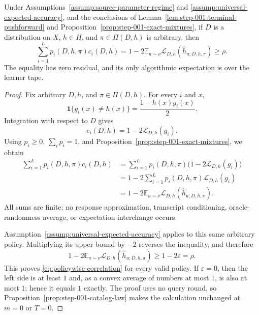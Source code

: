 \begin{lemma}
\label{lem:step-002-policywise-correlation}
Under Assumptions~\ref{assump:source-parameter-regime} and
\ref{assump:universal-expected-accuracy}, and the conclusions of
Lemma~\ref{lem:step-001-terminal-pushforward} and
Proposition~\ref{prop:step-001-exact-mixtures}, if $D$ is a distribution on
$X$, $h\in H$, and $\pi\in\Pi(D,h)$ is arbitrary, then
\begin{equation}\label{eq:policywise-correlation}
\sum_{i=1}^Lp_i(D,h,\pi)c_i(D,h)
=1-2\mathbb E_{u\sim\nu}
\mathcal L_{D,h}(\widehat h_{u;D,h,\pi})
\ge\rho.
\end{equation}
The equality has zero residual, and its only algorithmic expectation is over
the learner tape.
\end{lemma}

\begin{proof}
Fix arbitrary $D,h$, and $\pi\in\Pi(D,h)$.  For every $i$ and $x$,
\[
\mathbf 1\{g_i(x)\ne h(x)\}=\frac{1-h(x)g_i(x)}2.
\]
Integration with respect to $D$ gives
\begin{equation}\label{eq:catalog-binary-correlation}
c_i(D,h)=1-2\mathcal L_{D,h}(g_i).
\end{equation}
Using $p_i\ge0$, $\sum_i p_i=1$, and
Proposition~\ref{prop:step-001-exact-mixtures}, we obtain
\begin{align*}
\sum_{i=1}^Lp_i(D,h,\pi)c_i(D,h)
&=\sum_{i=1}^Lp_i(D,h,\pi)
  \bigl(1-2\mathcal L_{D,h}(g_i)\bigr)\\
&=1-2\sum_{i=1}^Lp_i(D,h,\pi)\mathcal L_{D,h}(g_i)\\
&=1-2\mathbb E_{u\sim\nu}
  \mathcal L_{D,h}(\widehat h_{u;D,h,\pi}).
\end{align*}
All sums are finite; no response approximation, transcript conditioning,
oracle-randomness average, or expectation interchange occurs.

Assumption~\ref{assump:universal-expected-accuracy} applies to this same
arbitrary policy.  Multiplying its upper bound by $-2$ reverses the
inequality, and therefore
\[
1-2\mathbb E_{u\sim\nu}
\mathcal L_{D,h}(\widehat h_{u;D,h,\pi})
\ge1-2\varepsilon=\rho.
\]
This proves \eqref{eq:policywise-correlation} for every valid policy.  If
$\varepsilon=0$, then the left side is at least $1$ and, as a convex average
of numbers at most $1$, is also at most $1$; hence it equals $1$ exactly.
The proof uses no query round, so
Proposition~\ref{prop:step-001-catalog-law} makes the calculation unchanged at
$m=0$ or $T=0$.
\end{proof}

